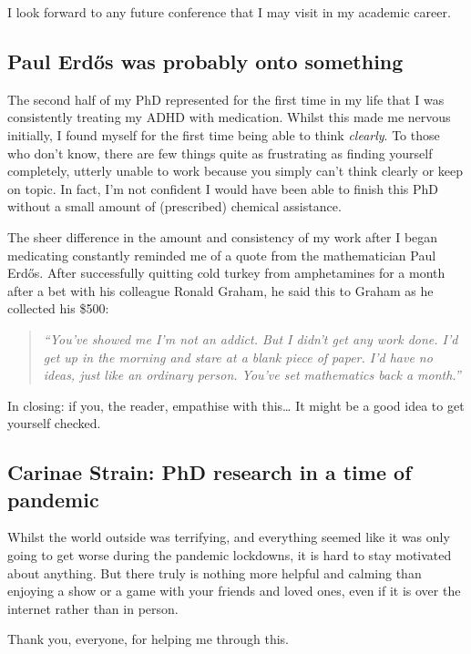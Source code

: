 I look forward to any future conference that I may visit in my academic career.

\subsection{Paul Erd\H{o}s was probably onto something}

The second half of my PhD represented for the first time in my life that I was consistently treating my ADHD with medication.
Whilst this made me nervous initially, I found myself for the first time being able to think \emph{clearly}.
To those who don't know, there are few things quite as frustrating as finding yourself completely, utterly unable to work because you simply can't think clearly or keep on topic.
In fact, I'm not confident I would have been able to finish this PhD without a small amount of (prescribed) chemical assistance.

The sheer difference in the amount and consistency of my work after I began medicating constantly reminded me of a quote from the mathematician Paul Erd\H{o}s.
After successfully quitting cold turkey from amphetamines for a month after a bet with his colleague Ronald Graham, he said this to Graham as he collected his \$500:

\begin{quote}
  \emph{
  \noindent
  ``You've showed me I'm not an addict. But I didn't get any work done. I'd get up in the morning and stare at a blank piece of paper. I'd have no ideas, just like an ordinary person. You've set mathematics back a month.''
  }
\end{quote}

\noindent
In closing: if you, the reader, empathise with this\ldots{} It might be a good idea to get yourself checked.

\subsection{Carinae Strain: PhD research in a time of pandemic}
\label{sec:pandemic}

Whilst the world outside was terrifying, and everything seemed like it was only going to get worse during the pandemic lockdowns, it is hard to stay motivated about anything.
But there truly is nothing more helpful and calming than enjoying a show or a game with your friends and loved ones, even if it is over the internet rather than in person.

\begin{center}
  Thank you, everyone, for helping me through this.
\end{center}

